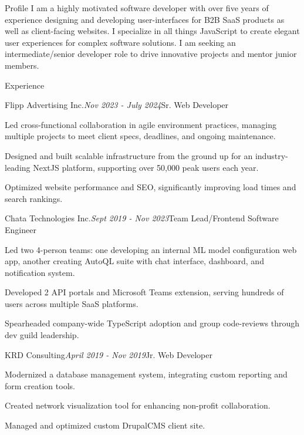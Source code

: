 \documentclass{resume}
\begin{document}
\begin{rSection}{Profile}
  I am a highly motivated software developer with over five years of experience designing and developing user-interfaces 
  for B2B SaaS products as well as client-facing websites. I specialize in all things JavaScript to create elegant user 
  experiences for complex software solutions. I am seeking an intermediate/senior developer role to drive innovative 
  projects and mentor junior members.
\end{rSection}


\begin{rSection}{Experience}

    \begin{rSubsection}{Flipp Advertising Inc.}{\em Nov 2023 - July 2024}{Sr. Web Developer}{}
      \item Led cross-functional collaboration in agile environment practices, managing multiple projects to meet client specs, deadlines, and ongoing maintenance.
      \item Designed and built scalable infrastructure from the ground up for an industry-leading NextJS platform, supporting over 50,000 peak users each year.
      \item Optimized website performance and SEO, significantly improving load times and search rankings.
    \end{rSubsection}
    \begin{rSubsection}{Chata Technologies Inc.}{\em Sept 2019 - Nov 2023}{Team Lead/Frontend Software Engineer}{}
      \item Led two 4-person teams: one developing an internal ML model configuration web app, another creating AutoQL suite with chat interface, dashboard, and notification system.
      \item Developed 2 API portals and Microsoft Teams extension, serving hundreds of users across multiple SaaS platforms.
      \item Spearheaded company-wide TypeScript adoption and group code-reviews through dev guild leadership.
    \end{rSubsection}
    \begin{rSubsection}{KRD Consulting}{\em April 2019 - Nov 2019}{Jr. Web Developer}{}
      \item Modernized a database management system, integrating custom reporting and form creation tools.
      \item Created network visualization tool for enhancing non-profit collaboration.
      \item Managed and optimized custom DrupalCMS client site.
    \end{rSubsection}
    
\end{rSection}
\end{document}
